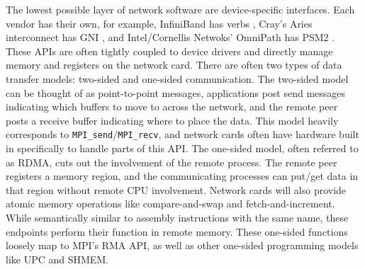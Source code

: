 The lowest possible layer of network software are device-specific interfaces. 
Each vendor has their own, for example, InfiniBand has verbs \cite{IBSpec}, Cray's Aries interconnect has \gls{GNI} \cite{Choi2015ImplOfOFILibfabricGNI}, and Intel/Cornellis Netwoks' OmniPath has \gls{PSM2} \cite{IntelPSM2ProgGuide}.
These \gls{API}s are often tightly coupled to device drivers and directly manage memory and registers on the network card.
There are often two types of data transfer models: two-sided and one-sided communication.
The two-sided model can be thought of as point-to-point messages, applications post send messages indicating which buffers to move to across the network, and the remote peer posts a receive buffer indicating where to place the data.
This model heavily corresponds to \texttt{MPI\_send}/\texttt{MPI\_recv}, and network cards often have hardware built in specifically to handle parts of this \gls{API}.  
The one-sided model, often referred to as \gls{RDMA}, cuts out the involvement of the remote process.
The remote peer registers a memory region, and the communicating processes can put/get data in that region without remote \gls{CPU} involvement.
Network cards will also provide atomic memory operations like compare-and-swap and fetch-and-increment.
While semantically similar to assembly instructions with the same name, these endpoints perform their function in remote memory.
These one-sided functions loosely map to \gls{MPI}'s \gls{RMA} \gls{API}, as well as other one-sided programming models like \gls{UPC} and SHMEM.

